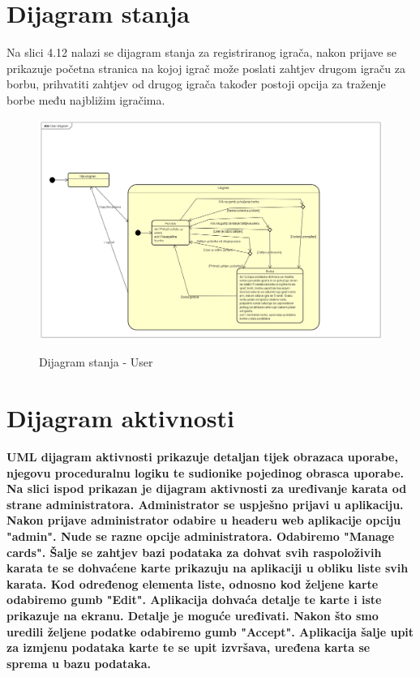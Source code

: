 			\eject
		
		\section{Dijagram stanja}
			
			
			\textnormal{Na slici 4.12 nalazi se dijagram stanja za registriranog igrača, nakon prijave se prikazuje početna stranica na kojoj igrač može poslati zahtjev drugom igraču za borbu, prihvatiti zahtjev od drugog igrača također postoji opcija za traženje borbe među najbližim igračima.  }
			
						\begin{figure}[H]
				\centering
				\includegraphics[scale=0.40]{dijagrami/user_diagram} \\
				\caption{Dijagram stanja - User}
				\label{fig:user}
			\end{figure}
			
			
			\eject 
		
		\section{Dijagram aktivnosti}
			
			\textbf{\textnormal{UML dijagram aktivnosti prikazuje detaljan tijek obrazaca uporabe, njegovu proceduralnu logiku te sudionike pojedinog obrasca uporabe. Na slici ispod prikazan je dijagram aktivnosti za uređivanje karata od strane administratora. Administrator se uspješno prijavi u aplikaciju. Nakon prijave administrator odabire u headeru web aplikacije opciju "admin". Nude se razne opcije administratora. Odabiremo "Manage cards". Šalje se zahtjev bazi podataka za dohvat svih raspoloživih karata te se dohvaćene karte prikazuju na aplikaciji u obliku liste svih karata. Kod određenog elementa liste, odnosno kod željene karte odabiremo gumb "Edit". Aplikacija dohvaća detalje te karte i iste prikazuje na ekranu. Detalje je moguće uređivati. Nakon što smo uredili željene podatke odabiremo gumb "Accept". Aplikacija šalje upit za izmjenu podataka karte te se upit izvršava, uređena karta se sprema u bazu podataka.}}\\

